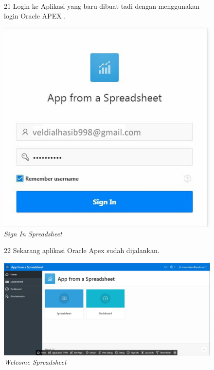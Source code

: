 \begin{enumerate}
\begin{figure}
\item[21]Login ke Aplikasi yang baru dibuat tadi dengan menggunakan login Oracle APEX .

    \begin{center}
\includegraphics[scale=0.4]{figures/create5.jpeg}
    \caption{\textit{Sign In Spreadsheet}}
        \end{center}
\label{gambar}
\end{figure}

\begin{figure}
\item[22]Sekarang aplikasi Oracle Apex sudah dijalankan.

    \begin{center}
\includegraphics[scale=0.4]{figures/congratz.jpg}
    \caption{\textit{Welcome Spreadsheet}}
        \end{center}
\label{gambar}
\end{figure}

\end{enumerate}
